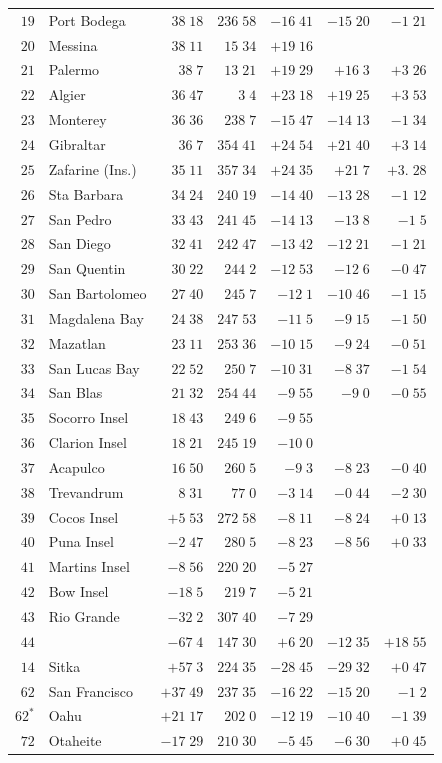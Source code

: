 \begin{center}
{\begin{tabular}{r|l||r|r||r|r|r}
$19$&Port Bodega&$38\;18$&$236\;58$&$-16\;41$&$-15\;20$&$-1\;21$\\
$20$&Messina&$38\;11$&$15\;34$&$+19\;16$&&\\[2pt]
$21$&Palermo&$38\;7$&$13\;21$&$+19\;29$&$+16\;3$&$+3\;26$\\
$22$&Algier&$36\;47$&$3\;4$&$+23\;18$&$+19\;25$&$+3\;53$\\
$23$&Monterey&$36\;36$&$238\;7$&$-15\;47$&$-14\;13$&$-1\;34$\\
$24$&Gibraltar&$36\;7$&$354\;41$&$+24\;54$&$+21\;40$&$+3\;14$\\
$25$&Zafarine (Ins.)&$35\;11$&$357\;34$&$+24\;35$&$+21\;7$&$+3.\;28$\\
$26$&Sta Barbara&$34\;24$&$240\;19$&$-14\;40$&$-13\;28$&$-1\;12$\\
$27$&San Pedro&$33\;43$&$241\;45$&$-14\;13$&$-13\;8$&$-1\;5$\\
$28$&San Diego&$32\;41$&$242\;47$&$-13\;42$&$-12\;21$&$-1\;21$\\
$29$&San Quentin&$30\;22$&$244\;2$&$-12\;53$&$-12\;6$&$-0\;47$\\
$30$&San Bartolomeo&$27\;40$&$245\;7$&$-12\;1$&$-10\;46$&$-1\;15$\\[2pt]
$31$&Magdalena Bay&$24\;38$&$247\;53$&$-11\;5$&$-9\;15$&$-1\;50$\\
$32$&Mazatlan&$23\;11$&$253\;36$&$-10\;15$&$-9\;24$&$-0\;51$\\
$33$&San Lucas Bay&$22\;52$&$250\;7$&$-10\;31$&$-8\;37$&$-1\;54$\\
$34$&San Blas&$21\;32$&$254\;44$&$-9\;55$&$-9\;0$&$-0\;55$\\
$35$&Socorro Insel&$18\;43$&$249\;6$&$-9\;55$&&\\
$36$&Clarion Insel&$18\;21$&$245\;19$&$-10\;0$&&\\
$37$&Acapulco&$16\;50$&$260\;5$&$-9\;3$&$-8\;23$&$-0\;40$\\
$38$&Trevandrum&$8\;31$&$77\;0$&$-3\;14$&$-0\;44$&$-2\;30$\\
$39$&Cocos Insel&$+5\;53$&$272\;58$&$-8\;11$&$-8\;24$&$+0\;13$\\
$40$&Puna Insel&$-2\;47$&$280\;5$&$-8\;23$&$-8\;56$&$+0\;33$\\[2pt]
$41$&Martins Insel&$-8\;56$&$220\;20$&$-5\;27$&&\\
$42$&Bow Insel&$-18\;5$&$219\;7$&$-5\;21$&&\\
$43$&Rio Grande&$-32\;2$&$307\;40$&$-7\;29$&&\\
$44$&&$-67\;4$&$147\;30$&$+6\;20$&$-12\;35$&$+18\;55$\\[2pt]
$14$&Sitka&$+57\;3$&$224\;35$&$-28\;45$&$-29\;32$&$+0\;47$\\
$62$&San Francisco&$+37\;49$&$237\;35$&$-16\;22$&$-15\;20$&$-1\;2$\\
$62^{*}$&Oahu&$+21\;17$&$202\;0$&$-12\;19$&$-10\;40$&$-1\;39$\\
$72$&Otaheite&$-17\;29$&$210\;30$&$-5\;45$&$-6\;30$&$+0\;45$\\
\end{tabular}
}
\end{center}
